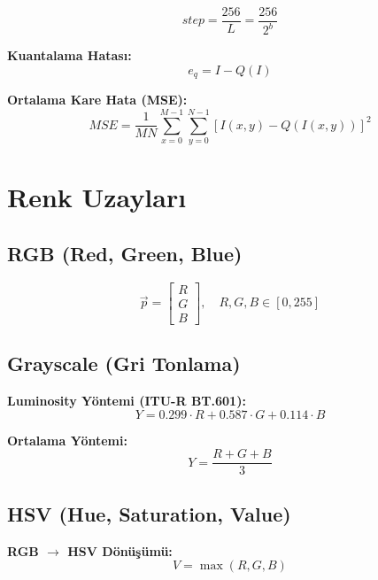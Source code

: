 \documentclass[12pt,a4paper]{article}
\begin{document}
\begin{equation}
step = \frac{256}{L} = \frac{256}{2^b}
\end{equation}

\textbf{Kuantalama Hatası:}
\begin{equation}
e_q = I - Q(I)
\end{equation}

\textbf{Ortalama Kare Hata (MSE):}
\begin{equation}
MSE = \frac{1}{MN} \sum_{x=0}^{M-1} \sum_{y=0}^{N-1} [I(x,y) - Q(I(x,y))]^2
\end{equation}

\section{Renk Uzayları}

\subsection{RGB (Red, Green, Blue)}
\begin{equation}
\vec{p} = \begin{bmatrix} R \\ G \\ B \end{bmatrix}, \quad R,G,B \in [0, 255]
\end{equation}

\subsection{Grayscale (Gri Tonlama)}

\textbf{Luminosity Yöntemi (ITU-R BT.601):}
\begin{equation}
Y = 0.299 \cdot R + 0.587 \cdot G + 0.114 \cdot B
\end{equation}

\textbf{Ortalama Yöntemi:}
\begin{equation}
Y = \frac{R + G + B}{3}
\end{equation}

\subsection{HSV (Hue, Saturation, Value)}

\textbf{RGB $\rightarrow$ HSV Dönüşümü:}
\begin{equation}
V = \max(R, G, B)
\end{equation}
\end{document}
